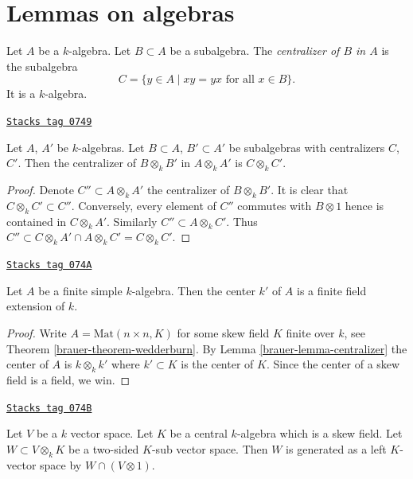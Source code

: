 \section{Lemmas on algebras}
\label{brauer-section-lemmas}
Let $A$ be a $k$-algebra. Let $B \subset A$ be a subalgebra.
The {\it centralizer of $B$ in $A$} is the subalgebra
$$
C  = \{y \in A \mid xy = yx \text{ for all }x \in B\}.
$$
It is a $k$-algebra.

\begin{lemma}[Centralizer]
\label{brauer-lemma-centralizer}
\href{https://stacks.math.columbia.edu/tag/0749}{\texttt{Stacks tag 0749}}

Let $A$, $A'$ be $k$-algebras. Let $B \subset A$, $B' \subset A'$ be
subalgebras with centralizers $C$, $C'$. Then the centralizer of
$B \otimes_k B'$ in $A \otimes_k A'$ is $C \otimes_k C'$.
\end{lemma}

\begin{proof}
Denote $C'' \subset A \otimes_k A'$ the centralizer of $B \otimes_k B'$.
It is clear that $C \otimes_k C' \subset C''$. Conversely, every element
of $C''$ commutes with $B \otimes 1$ hence is contained in $C \otimes_k A'$.
Similarly $C'' \subset A \otimes_k C'$. Thus
$C'' \subset C \otimes_k A' \cap A \otimes_k C' = C \otimes_k C'$.
\end{proof}

\begin{lemma}
\label{brauer-lemma-center-csa}
\href{https://stacks.math.columbia.edu/tag/074A}{\texttt{Stacks tag 074A}}

Let $A$ be a finite simple $k$-algebra. Then the center $k'$ of $A$
is a finite field extension of $k$.
\end{lemma}

\begin{proof}

Write $A = \text{Mat}(n \times n, K)$ for some skew field $K$ finite
over $k$, see
Theorem \ref{brauer-theorem-wedderburn}.
By
Lemma \ref{brauer-lemma-centralizer}
the center of $A$ is $k \otimes_k k'$ where $k' \subset K$ is the
center of $K$. Since the center of a skew field is a field, we win.
\end{proof}

\begin{lemma}
\label{brauer-lemma-generate-two-sided-sub}
\href{https://stacks.math.columbia.edu/tag/074B}{\texttt{Stacks tag 074B}}

Let $V$ be a $k$ vector space. Let $K$ be a central $k$-algebra
which is a skew field. Let $W \subset V \otimes_k K$ be a two-sided
$K$-sub vector space. Then $W$ is generated as a left $K$-vector
space by $W \cap (V \otimes 1)$.
\end{lemma}

